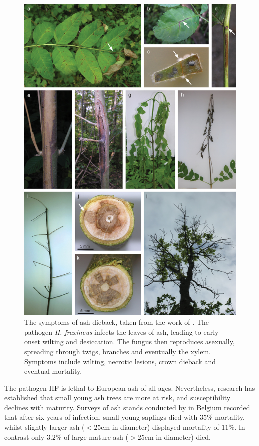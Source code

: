 \begin{figure}
    \centering
    \includegraphics[scale=0.5]{chapter2/figures/gross2014.jpg}
    \caption{
    The symptoms of ash dieback, taken from the work of \cite{gross2014h}. 
    The pathogen \textit{H. fraxineus} infects the leaves of ash, leading to early onset wilting and desiccation. 
    The fungus then reproduces asexually, spreading through twigs, branches and eventually the xylem. 
    Symptoms include wilting, necrotic lesions, crown dieback and eventual mortality.}
    \label{fig:ash-deiback-symptoms}
\end{figure}

The pathogen HF is lethal to European ash of all ages. 
Nevertheless, research has established that small young ash trees are more at risk,
and susceptibility declines with maturity. Surveys of ash stands conducted by \cite{marccais2017estimation} 
in Belgium recorded that after six years of infection, small young saplings died with $35\%$ mortality, 
whilst slightly larger ash ($<25 \mathrm{cm}$ in diameter) displayed mortality of $11\%$. 
In contrast only $3.2\%$ of large mature ash ($>25\mathrm{cm}$ in diameter) died.

